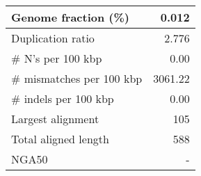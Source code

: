 \documentclass[12pt,a4paper]{article}
\begin{document}
\begin{table}[ht]
\begin{center}
\begin{tabular}{|l*{1}{|r}|}
Genome fraction (\%) & 0.012 \\ \hline
Duplication ratio & 2.776 \\ \hline
\# N's per 100 kbp & 0.00 \\ \hline
\# mismatches per 100 kbp & 3061.22 \\ \hline
\# indels per 100 kbp & 0.00 \\ \hline
Largest alignment & 105 \\ \hline
Total aligned length & 588 \\ \hline
NGA50 & - \\ \hline
\end{tabular}
\end{center}
\end{table}
\end{document}
